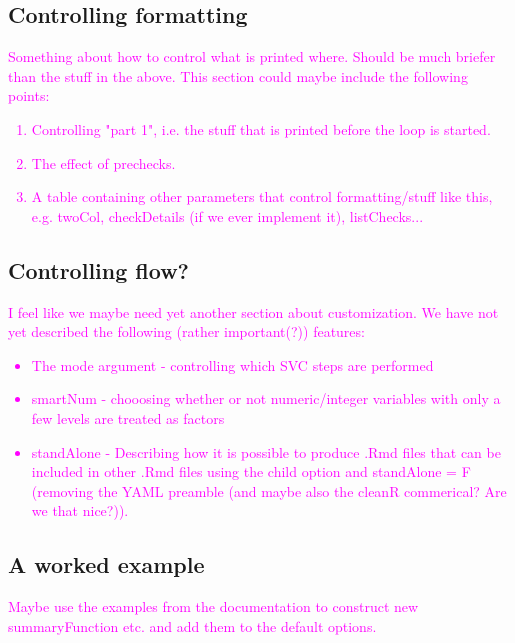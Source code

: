 \documentclass[article]{jss}
\newcommand{\hl}[1]{\textcolor{magenta}{#1}}
\begin{document}
\subsection{Controlling formatting}
\hl{Something about how to control what is printed where. Should be much briefer than the stuff in the above. This section could maybe include the following points:
\begin{enumerate}
\item Controlling "part 1", i.e. the stuff that is printed before the loop is started. 
\item The effect of prechecks.
\item A table containing other parameters that control formatting/stuff like this, e.g. twoCol, checkDetails (if we ever implement it), listChecks... 
\end{enumerate}
}

\subsection{Controlling flow?}
\hl{I feel like we maybe need yet another section about customization. We have not yet described the following (rather important(?)) features:
\begin{itemize}
\item The mode argument - controlling which SVC steps are performed
\item smartNum - chooosing whether or not numeric/integer variables with only a few levels are treated as factors
\item standAlone - Describing how it is possible to produce .Rmd files that can be included in other .Rmd files using the child option and standAlone = F (removing the YAML preamble (and maybe also the cleanR commerical? Are we that nice?)). 
\end{itemize}
}

\subsection{A worked example}
\hl{Maybe use the examples from the documentation to construct new summaryFunction etc. and add them to the default options. }
\end{document}
